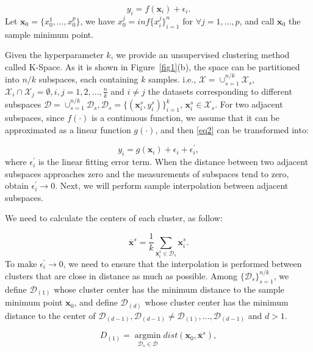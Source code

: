\documentclass[sn-mathphys,Numbered]{sn-jnl}%
\theoremstyle{thmstyleone}%
\theoremstyle{thmstyletwo}%
\theoremstyle{thmstylethree}%
\begin{document}
\begin{equation}
y_i=f(\boldsymbol{x}_i)+\epsilon_i.\label{eq2}
\end{equation}
Let $\boldsymbol{x}_0=\{x_0^1,\ldots,x_0^p\}$, we have $x_0^j=inf\{x_i^j\}_{i=1}^n$ for $\forall j=1,\ldots,p$, and call $\boldsymbol{x}_0$ the sample minimum point. 

Given the hyperparameter $k$, we provide an unsupervised clustering method called K-Space. As it is shown in Figure~\ref{fig1}(b), the space can be partitioned into $n/k$ subspaces, each containing $k$ samples. i.e., $\mathcal{X}=\cup_{s=1}^{n/k}\mathcal{X}_s$, $\mathcal{X}_i\cap\mathcal{X}_j=\emptyset,i,j=1,2,\ldots,\frac{n}{k}$ and $i\neq j$ the datasets corresponding to different subspaces $\mathcal{D}=\cup_{s=1}^{n/k}\mathcal{D}_s,\mathcal{D}_s=\{(\boldsymbol{x}_i^s,y_i^s)\}_{i=1}^k$, $\boldsymbol{x}_i^s\in\mathcal{X}_s$. For two adjacent subspaces, since $f(\cdot)$ is a continuous function, we assume that it can be approximated as a linear function $g(\cdot)$, and then \eqref{eq2} can be transformed into:

\begin{equation}
y_i=g(\boldsymbol{x}_i)+\epsilon_i+\epsilon_i^\prime,\label{eq3}
\end{equation}
where $\epsilon_i^\prime$ is the linear fitting error term. When the distance between two adjacent subspaces approaches zero and the measurements of subspaces tend to zero, obtain $\epsilon_i^\prime\rightarrow0$. Next, we will perform sample interpolation between adjacent subspaces.

We need to calculate the centers of each cluster, as follow:

\begin{equation}
\overline{\boldsymbol{x}}^s=\dfrac{1}{k}\sum\limits_{\boldsymbol{x}_i^s\in\mathcal{D}_s}\boldsymbol{x}_i^s.\label{eq4}
\end{equation}
To make $\epsilon_i^\prime\rightarrow0$, we need to ensure that the interpolation is performed between clusters that are close in distance as much as possible. Among $\{\mathcal{D}_s\}_{s=1}^{n/k}$, we define $\mathcal{D}_{(1)}$ whose cluster center has the minimum distance to the sample minimum point $\boldsymbol{x}_0$, and define $\mathcal{D}_{(d)}$ whose cluster center has the minimum distance to the center of $\mathcal{D}_{(d-1)},\mathcal{D}_{(d-1)}\neq\mathcal{D}_{(1)},\ldots,\mathcal{D}_{(d-1)}$ and $d>1$.

\begin{equation}
D_{(1)}=\mathop{argmin}\limits_{\mathcal{D}_s\in\mathcal{D}}dist(\boldsymbol{x}_0,\overline{\boldsymbol{x}}^s),\label{eq5}
\end{equation}
\end{document}
